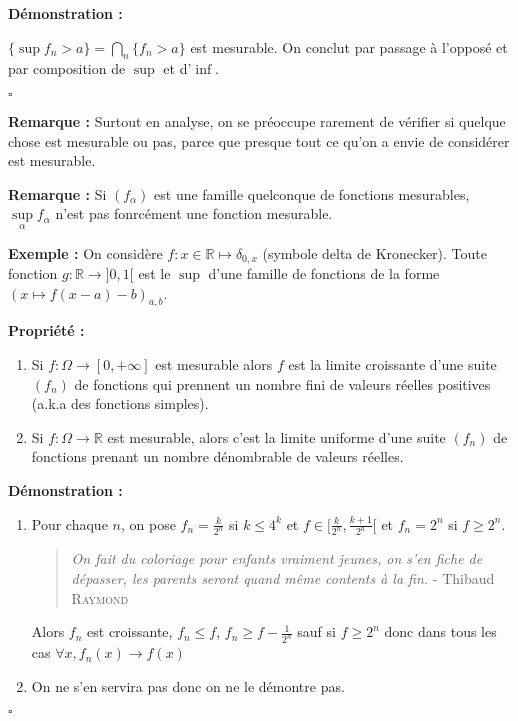 \documentclass[10pt,a4paper,notitlepage ]{report}
\newcommand{\R}{\mathbb R}
\newcommand{\1}{\mathds 1}
\newcounter{th}
\newenvironment{propriete}[1][]{
	\begin{tcolorbox}
		\textbf{Propriété #1 : }
}
{\end{tcolorbox}}
\newenvironment{demo}[1][]{

	\textbf{Démonstration #1 :}
}{\begin{flushright}
	$\square$
\end{flushright}
}
\newenvironment{exemple}{
	
	\textbf{Exemple :} }{}
\newenvironment{rem}{
	
		\textbf{Remarque :}}{}
\begin{document}
\begin{demo}
	$\{\sup f_n > a\} = \bigcap_n \{f_n > a\}$ est mesurable. On conclut par passage à l'opposé et par composition de $\sup$ et d'$\inf$.
\end{demo}

\begin{rem}
	Surtout en analyse, on se préoccupe rarement de vérifier si quelque chose est mesurable ou pas, parce que presque tout ce qu'on a envie de considérer est mesurable.
\end{rem}

\begin{rem}
	Si $(f_\alpha)$ est une famille quelconque de fonctions mesurables, $\underset\alpha\sup f_\alpha$ n'est pas fonrcément une fonction mesurable.
	
	\begin{exemple}
		On considère $f : x \in \R \mapsto \delta_{0,x}$ (symbole delta de Kronecker). Toute fonction $g : \R \rightarrow ]0,1[$ est le $\sup$ d'une famille de fonctions de la forme $(x\mapsto f(x-a)-b)_{a,b}$.
	\end{exemple}
\end{rem}

\begin{propriete}
	\begin{enumerate}
		\item Si $f:\Omega \rightarrow [0,+\infty]$ est mesurable alors $f$ est la limite croissante d'une suite $(f_n)$ de fonctions qui prennent un nombre fini de valeurs réelles positives (a.k.a des fonctions simples).
		\item Si $f: \Omega \rightarrow \R$ est mesurable, alors c'est la limite uniforme d'une suite $(f_n)$ de fonctions prenant un nombre dénombrable de valeurs réelles.
	\end{enumerate}
\end{propriete}

\begin{demo}
	\begin{enumerate}
		\item Pour chaque $n$, on pose $f_n = \frac k {2^n}$ si $k \le 4^k$ et $f\in[\frac k {2^n}, \frac {k+1}{2^n}[$ et $f_n = 2^n$ si $f \ge 2^n$.
		\begin{quote}
			\textit{On fait du coloriage pour enfants vraiment jeunes, on s'en fiche de dépasser, les parents seront quand même contents à la fin.} - Thibaud \textsc{Raymond}
		\end{quote}
		Alors $f_n$ est croissante, $f_n \le f$, $f_n \ge f-\frac 1 {2^n}$ sauf si $f\ge 2^n$ donc dans tous les cas $\forall x, f_n(x) \rightarrow f(x)$
		\item On ne s'en servira pas donc on ne le démontre pas.
	\end{enumerate}
\end{demo}
\end{document}
